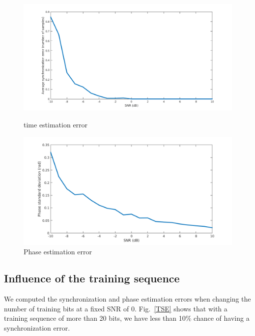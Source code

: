 \documentclass[a4paper,12pt]{article}
\begin{document}
\begin{figure}[ht]
\begin{minipage}[c]{.45\linewidth}
\begin{center}
\includegraphics[scale=0.35]{SynError.png}
\caption{time estimation error}
\label{SE}
\end{center}
\end{minipage}
\hfill
\begin{minipage}[c]{.45\linewidth}
\begin{center}
\includegraphics[scale=0.35]{PhaseError.png}
\caption{Phase estimation error}
\label{PE}
\end{center}
\end{minipage}
\end{figure}

\subsection{Influence of the training sequence}

We computed the synchronization and phase estimation errors when changing the number of training bits at a fixed SNR of 0. Fig.~\ref{TSE} shows that with a training sequence of more than 20 bits, we have less than 10\% chance of having a synchronization error.\\
\end{document}
